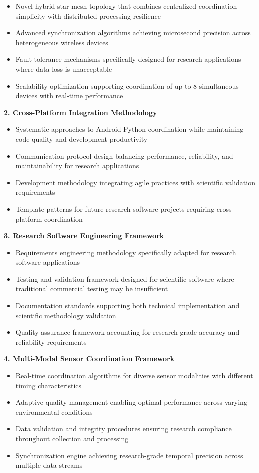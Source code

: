 \documentclass[12pt,a4paper]{report}
\begin{document}
\begin{itemize}
\item Novel hybrid star-mesh topology that combines centralized coordination simplicity with distributed processing
  resilience
\item Advanced synchronization algorithms achieving microsecond precision across heterogeneous wireless devices
\item Fault tolerance mechanisms specifically designed for research applications where data loss is unacceptable
\item Scalability optimization supporting coordination of up to 8 simultaneous devices with real-time performance

\end{itemize}
\textbf{2. Cross-Platform Integration Methodology}

\begin{itemize}
\item Systematic approaches to Android-Python coordination while maintaining code quality and development productivity
\item Communication protocol design balancing performance, reliability, and maintainability for research applications
\item Development methodology integrating agile practices with scientific validation requirements
\item Template patterns for future research software projects requiring cross-platform coordination

\end{itemize}
\textbf{3. Research Software Engineering Framework}

\begin{itemize}
\item Requirements engineering methodology specifically adapted for research software applications
\item Testing and validation framework designed for scientific software where traditional commercial testing may be
  insufficient
\item Documentation standards supporting both technical implementation and scientific methodology validation
\item Quality assurance framework accounting for research-grade accuracy and reliability requirements

\end{itemize}
\textbf{4. Multi-Modal Sensor Coordination Framework}

\begin{itemize}
\item Real-time coordination algorithms for diverse sensor modalities with different timing characteristics
\item Adaptive quality management enabling optimal performance across varying environmental conditions
\item Data validation and integrity procedures ensuring research compliance throughout collection and processing
\item Synchronization engine achieving research-grade temporal precision across multiple data streams

\end{itemize}
\end{document}
